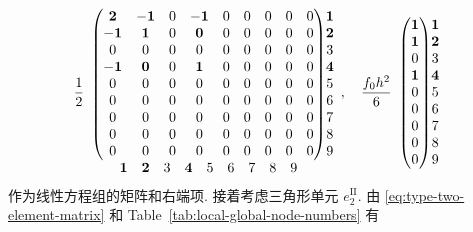 \[\frac12\begin{array}{c@{}c}
\begin{pmatrix}
\mathbf2&\mathbf{-1}&0&\mathbf{-1}&0&0&0&0&0\\
\mathbf{-1}&\mathbf1&0&\mathbf0&0&0&0&0&0\\
0&0&0&0&0&0&0&0&0\\
\mathbf{-1}&\mathbf0&0&\mathbf1&0&0&0&0&0\\
0&0&0&0&0&0&0&0&0\\0&0&0&0&0&0&0&0&0\\0&0&0&0&0&0&0&0&0\\0&0&0&0&0&0&0&0&0\\0&0&0&0&0&0&0&0&0
\end{pmatrix}&\begin{matrix}\mathbf1\\\mathbf2\\3\\\mathbf4\\5\\6\\7\\8\\9\end{matrix}\\
\begin{matrix}\mathbf1&\mathbf2&3&\mathbf4&5&6&7&8&9\end{matrix}&
\end{array},\quad\frac{f_0h^2}{6}\begin{array}{c@{}c}
\begin{pmatrix}\mathbf1\\\mathbf1\\0\\\mathbf1\\0\\0\\0\\0\\0\end{pmatrix}&\begin{matrix}\mathbf1\\\mathbf2\\3\\\mathbf4\\5\\6\\7\\8\\9\end{matrix}
\end{array}\]
{作为线性方程组的矩阵和右端项. 接着考虑三角形单元 $e_2^{\mathrm {II}}$. 由 \eqref{eq:type-two-element-matrix} 和 Table\ \ref{tab:local-global-node-numbers} 有}
